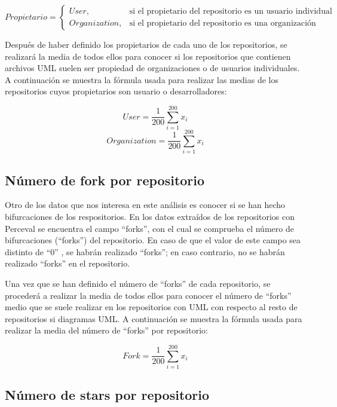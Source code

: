 \documentclass[a4paper, 12pt]{book}
\begin{document}
\begin{equation}
  Propietario =
  \begin{cases}
  User, & \text{si el propietario del repositorio es un usuario individual} \\
  Organization, & \text{si el propietario del repositorio es una organización}
  \end{cases}
\end{equation}

Después de haber definido los propietarios de cada uno de los repositorios, se realizará la media de todos ellos para conocer si los repositorios que contienen archivos UML suelen ser propiedad de organizaciones o de usuarios individuales.
A continuación se muestra la fórmula usada para realizar las medias de los repositorios cuyos propietarios son usuario o desarrolladores:

\[{User} = \frac{1}{200} \sum_{i=1}^{200} x_i\]
\[{Organization} = \frac{1}{200} \sum_{i=1}^{200} x_i\]


\subsection{Número de fork por repositorio} %
\label{sec:Número de fork por repositorio}

Otro de los datos que nos interesa en este análisis es conocer si se han hecho bifurcaciones de los respositorios.
En los datos extraídos de los repositorios con Perceval se encuentra el campo ``forks'', con el cual se comprueba el número de bifurcaciones (``forks'') del repositorio.
En caso de que el valor de este campo sea distinto de ``0'' , se habrán realizado ``forks''; en caso contrario, no se habrán realizado ``forks'' en el repositorio.


Una vez que se han definido el número de ``forks'' de cada repositorio, se procederá a realizar la media de todos ellos para conocer el número de ``forks'' medio que se suele realizar en los repositorios con UML con respecto al resto de repositorios si diagramas UML.
A continuación se muestra la fórmula usada para realizar la media del número de ``forks'' por repositorio:


\[{Fork} = \frac{1}{200} \sum_{i=1}^{200} x_i\]


\subsection{Número de stars por repositorio} %
\label{sec:número de stars por repositorio}
\end{document}
